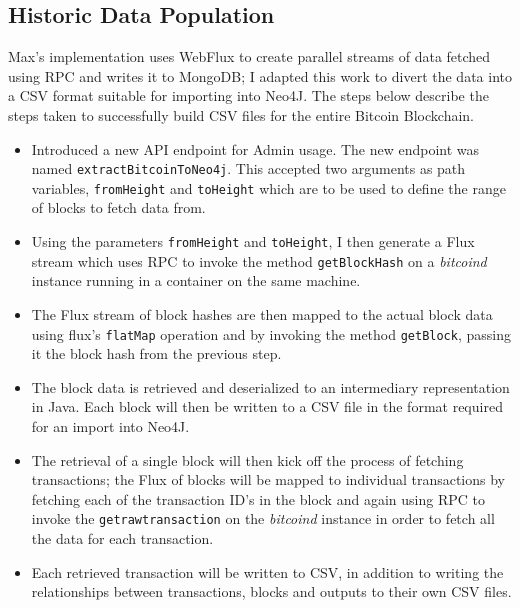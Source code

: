 \subsection{Historic Data Population}
Max's implementation uses WebFlux to create parallel streams of data fetched using RPC and writes it to MongoDB; I adapted this work to divert the data into a CSV format suitable for importing into Neo4J. The steps below describe the steps taken to successfully build CSV files for the entire Bitcoin Blockchain. 

\begin{itemize}
    \item Introduced a new API endpoint for Admin usage. The new endpoint was named \texttt{extractBitcoinToNeo4j}. This accepted two arguments as path variables, \texttt{fromHeight} and \texttt{toHeight} which are to be used to define the range of blocks to fetch data from. 
    \item Using the parameters \texttt{fromHeight} and \texttt{toHeight}, I then generate a Flux stream which uses RPC to invoke the method \texttt{getBlockHash} on a \textit{bitcoind} instance running in a container on the same machine. 
    \item The Flux stream of block hashes are then mapped to the actual block data using flux's \texttt{flatMap} operation and by invoking the method \texttt{getBlock}, passing it the block hash from the previous step. 
    \item The block data is retrieved and deserialized to an intermediary representation in Java. Each block will then be written to a CSV file in the format required for an import into Neo4J. 
    \item The retrieval of a single block will then kick off the process of fetching transactions; the Flux of blocks will be mapped to individual transactions by fetching each of the transaction ID's in the block and again using RPC to invoke the \texttt{getrawtransaction} on the \textit{bitcoind} instance in order to fetch all the data for each transaction. 
    \item Each retrieved transaction will be written to CSV, in addition to writing the relationships between transactions, blocks and outputs to their own CSV files. 
\end{itemize}

